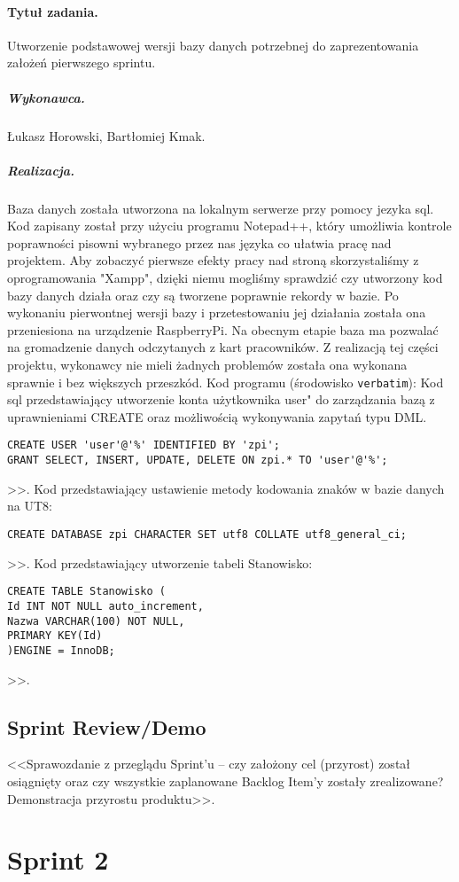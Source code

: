 \documentclass[a4paper]{article}
\begin{document}
\paragraph{Tytuł zadania.} Utworzenie podstawowej wersji bazy danych potrzebnej do zaprezentowania założeń pierwszego sprintu.
\subparagraph{Wykonawca.} Łukasz Horowski, Bartłomiej Kmak.
\subparagraph{Realizacja.} Baza danych została utworzona na lokalnym serwerze przy pomocy jezyka sql. Kod zapisany został przy użyciu programu Notepad++, który umożliwia kontrole poprawności pisowni wybranego przez nas języka co ułatwia pracę nad projektem. Aby zobaczyć pierwsze efekty pracy nad stroną skorzystaliśmy z oprogramowania "Xampp", dzięki niemu mogliśmy sprawdzić czy utworzony kod bazy danych działa oraz czy są tworzene poprawnie rekordy w bazie. Po wykonaniu pierwontnej wersji bazy i przetestowaniu jej działania została ona przeniesiona na urządzenie RaspberryPi. Na obecnym etapie baza ma pozwalać na gromadzenie danych odczytanych z kart pracowników. Z realizacją tej części projektu, wykonawcy nie mieli żadnych problemów została ona wykonana sprawnie i bez większych przeszkód.  
Kod programu (środowisko \texttt{verbatim}): 
Kod sql przedstawiający utworzenie konta użytkownika user" do zarządzania bazą z uprawnieniami CREATE oraz możliwością wykonywania zapytań typu DML.
\begin{verbatim}
CREATE USER 'user'@'%' IDENTIFIED BY 'zpi';
GRANT SELECT, INSERT, UPDATE, DELETE ON zpi.* TO 'user'@'%';
\end{verbatim}>>.
Kod przedstawiający ustawienie metody kodowania znaków w bazie danych na UT8:
\begin {verbatim}
CREATE DATABASE zpi CHARACTER SET utf8 COLLATE utf8_general_ci;
\end {verbatim}>>.
Kod przedstawiający utworzenie tabeli Stanowisko:
\begin {verbatim}
CREATE TABLE Stanowisko (
Id INT NOT NULL auto_increment,
Nazwa VARCHAR(100) NOT NULL,
PRIMARY KEY(Id)
)ENGINE = InnoDB;
\end{verbatim}>>.


\subsection{Sprint Review/Demo}
<<Sprawozdanie z przeglądu Sprint'u -- czy założony cel (przyrost) został osiągnięty oraz czy wszystkie zaplanowane Backlog Item'y zostały zrealizowane? Demonstracja przyrostu produktu>>.

\section{Sprint 2}
\end{document}
